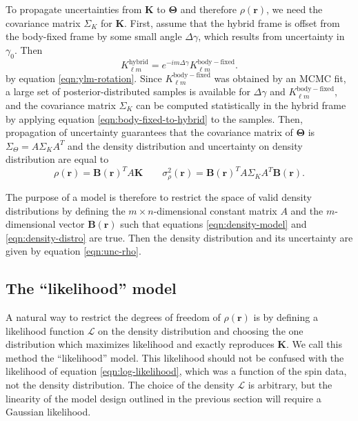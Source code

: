 \documentclass[fleqn,usenatbib]{mnras}
\begin{document}
To propagate uncertainties from $\bm K$ to $\bm \Theta$ and therefore $\rho(\bm r)$, we need the covariance matrix $\Sigma_K$ for $\bm K$. First, assume that the hybrid frame is offset from the body-fixed frame by some small angle $\Delta \gamma$, which results from uncertainty in $\gamma_0$. Then
\begin{equation}
  K_{\ell m}^\mathrm{hybrid} = e^{-im\Delta \gamma}K_{\ell m}^\mathrm{body-fixed}.
  \label{eqn:body-fixed-to-hybrid}
\end{equation}
by equation \ref{eqn:ylm-rotation}. Since $K_{\ell m}^\mathrm{body-fixed}$ was obtained by an MCMC fit, a large set of posterior-distributed samples is available for $\Delta \gamma$ and $K_{\ell m}^\mathrm{body-fixed}$, and the covariance matrix $\Sigma_K$ can be computed statistically in the hybrid frame by applying equation \ref{eqn:body-fixed-to-hybrid} to the samples. Then, propagation of uncertainty guarantees that the covariance matrix of $\bm \Theta$ is $\Sigma_\Theta = A \Sigma_K A^T$ and the density distribution and uncertainty on density distribution are equal to
\begin{equation}
  \rho(\bm r) = \bm B(\bm r)^T A\bm K \qquad \sigma^2_\rho(\bm r) = \bm B(\bm r)^T A \Sigma_K A^T \bm B(\bm r).
  \label{eqn:unc-rho}
\end{equation}

The purpose of a model is therefore to restrict the space of valid density distributions by defining the $m\times n$-dimensional constant matrix $A$ and the $m$-dimensional vector $\bm B(\bm r)$ such that equations \ref{eqn:density-model} and \ref{eqn:density-distro} are true. Then the density distribution and its uncertainty are given by equation \ref{eqn:unc-rho}.



\subsection{The ``likelihood'' model}
\label{sec:likelihood}

A natural way to restrict the degrees of freedom of $\rho(\bm r)$ is by defining a likelihood function $\mathcal{L}$ on the density distribution and choosing the one distribution which maximizes likelihood and exactly reproduces $\bm K$. We call this method the ``likelihood'' model. This likelihood should not be confused with the likelihood of equation \ref{eqn:log-likelihood}, which was a function of the spin data, not the density distribution. The choice of the density $\mathcal{L}$ is arbitrary, but the linearity of the model design outlined in the previous section will require a Gaussian likelihood.
\end{document}
